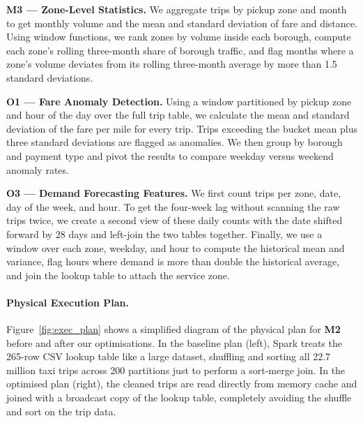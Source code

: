 \documentclass[sigconf,nonacm]{acmart}
\begin{document}
\textbf{M3 --- Zone-Level Statistics.} We aggregate trips by pickup zone and month to get monthly volume and the mean and standard deviation of fare and distance. Using window functions, we rank zones by volume inside each borough, compute each zone's rolling three-month share of borough traffic, and flag months where a zone's volume deviates from its rolling three-month average by more than 1.5 standard deviations.

\textbf{O1 --- Fare Anomaly Detection.} Using a window partitioned by pickup zone and hour of the day over the full trip table, we calculate the mean and standard deviation of the fare per mile for every trip. Trips exceeding the bucket mean plus three standard deviations are flagged as anomalies. We then group by borough and payment type and pivot the results to compare weekday versus weekend anomaly rates.

\textbf{O3 --- Demand Forecasting Features.} We first count trips per zone, date, day of the week, and hour. To get the four-week lag without scanning the raw trips twice, we create a second view of these daily counts with the date shifted forward by 28 days and left-join the two tables together. Finally, we use a window over each zone, weekday, and hour to compute the historical mean and variance, flag hours where demand is more than double the historical average, and join the lookup table to attach the service zone.

\begin{table}[t]
\centering
\caption{M1 cleaning statistics on the 2020 dataset (after dropping null rows). A few stray rows had corrupted years.}
\label{tab:m1_stats}
\vspace{-0.15cm}
\vspace{-0.2cm}
\end{table}

\paragraph{Physical Execution Plan.}
Figure~\ref{fig:exec_plan} shows a simplified diagram of the physical plan for \textbf{M2} before and after our optimisations. In the baseline plan (left), Spark treats the 265-row CSV lookup table like a large dataset, shuffling and sorting all 22.7 million taxi trips across 200 partitions just to perform a sort-merge join. In the optimised plan (right), the cleaned trips are read directly from memory cache and joined with a broadcast copy of the lookup table, completely avoiding the shuffle and sort on the trip data.
\end{document}
